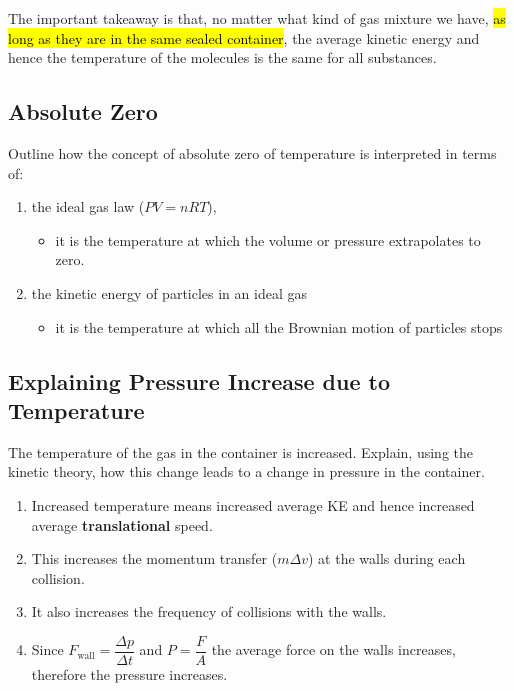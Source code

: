 \documentclass[a4paper,12pt]{article}
\begin{document}
The important takeaway is that, no matter what kind of gas mixture we have, \hl{as long as they are in the same sealed container}, the average kinetic energy and hence the temperature of the molecules is the same for all substances.

\pagebreak

\subsection{Absolute Zero}

Outline how the concept of absolute zero of temperature is interpreted in terms of:
\begin{enumerate}[label=(\alph*)]
  \item the ideal gas law ($PV = nRT$),
        \begin{itemize}
          \item it is the temperature at which the volume or pressure extrapolates to zero.
        \end{itemize}
  \item the kinetic energy of particles in an ideal gas
        \begin{itemize}
          \item it is the temperature at which all the Brownian motion of particles stops
        \end{itemize}
\end{enumerate}

\pagebreak

\subsection{Explaining Pressure Increase due to Temperature}

The temperature of the gas in the container is increased.
Explain, using the kinetic theory, how this change leads to a change in pressure in the container.

\begin{enumerate}
  \item Increased temperature means increased average KE and hence increased average \textbf{translational} speed.
  \item This increases the momentum transfer ($m\Delta v$) at the walls during each collision.
  \item It also increases the frequency of collisions with the walls.
  \item Since $F_{\text{wall}} = \dfrac{\Delta p}{\Delta t}$ and $P = \dfrac{F}{A}$ the average force on the walls increases, therefore the pressure increases.
\end{enumerate}
\pagebreak
\end{document}
